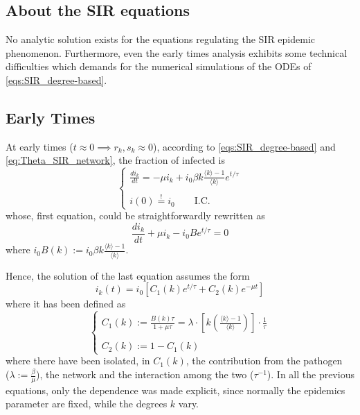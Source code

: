 \documentclass[a4paper,12pt,twoside]{book} %
\theoremstyle{definition}
\begin{document}
\subsection*{About the SIR equations}

No analytic solution exists for the equations regulating the SIR epidemic phenomenon. Furthermore, even the early times analysis exhibits some technical difficulties which demands for the numerical simulations of the ODEs of \autoref{eqs:SIR_degree-based}.

\subsection*{Early Times}
At early times ($t\approx 0 \implies r_k, s_k\approx0$), according to \autoref{eqs:SIR_degree-based} and \autoref{eq:Theta_SIR_network}, the fraction of infected is \vspace{3mm}
\begin{equation}
	\begin{cases}
		\frac{di_k}{dt} = - \mu i_k + i_0 \beta k \frac{\langle k \rangle -1}{\langle k \rangle } e^{t/\tau} \\ \\
		i(0) \stackrel{!}{=} i_0 \qquad \text{I.C.}
	\end{cases}
\end{equation}
whose, first equation, could be straightforwardly rewritten as
\begin{equation}
	\frac{d i_k}{dt} + \mu i_k - i_0 B e^{t/\tau} = 0
\end{equation}
where $i_0 B(k) := i_0 \beta k \frac{\langle k \rangle -1}{\langle k \rangle }$.

Hence, the solution of the last equation assumes the form
\begin{equation}
	i_k(t)=i_0 \left[C_1(k)e^{t/\tau} + C_2(k) e^{-\mu t}\right]
\end{equation}
where it has been defined as \vspace{3mm}
\begin{equation*}
	\begin{cases}
		C_1(k):= \frac{B(k) \tau}{1+ \mu \tau} = \lambda \cdot \left[k\left(\frac{\langle k \rangle -1}{\langle k \rangle }\right)\right]
		\cdot \frac{1}{\tau} \\ \\
		C_2(k):= 1 - C_1(k)
	\end{cases}
\end{equation*}
where there have been isolated, in $C_1(k)$,  the contribution from the pathogen \\($\lambda:=\frac{\beta}{\mu}$), the network and the interaction among the two ($\tau^{-1}$). In all the previous equations, only the dependence was made explicit, since normally the epidemics parameter are fixed, while the degrees $k$ vary.
\end{document}
